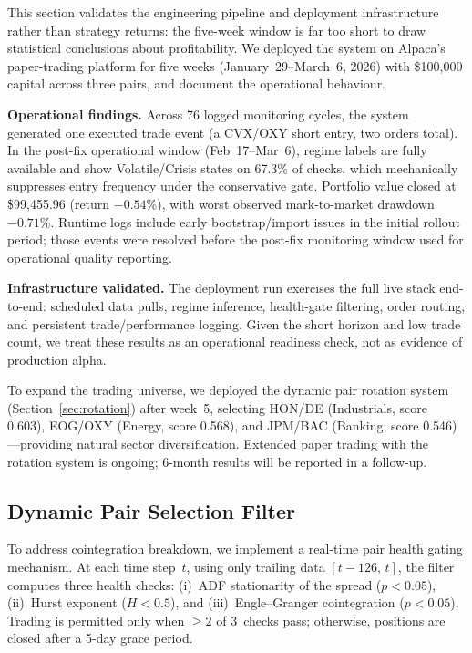 \documentclass{ieeeaccess}
\begin{document}
This section validates the engineering pipeline and deployment infrastructure rather than strategy returns: the five-week window is far too short to draw statistical conclusions about profitability.
We deployed the system on Alpaca's paper-trading platform for five weeks (January~29--March~6, 2026) with \$100{,}000 capital across three pairs, and document the operational behaviour.



\textbf{Operational findings.}
Across 76 logged monitoring cycles, the system generated one executed trade event (a CVX/OXY short entry, two orders total).
In the post-fix operational window (Feb~17--Mar~6), regime labels are fully available and show Volatile/Crisis states on 67.3\% of checks, which mechanically suppresses entry frequency under the conservative gate.
Portfolio value closed at \$99{,}455.96 (return $-0.54\%$), with worst observed mark-to-market drawdown $-0.71\%$.
Runtime logs include early bootstrap/import issues in the initial rollout period; those events were resolved before the post-fix monitoring window used for operational quality reporting.

\textbf{Infrastructure validated.}
The deployment run exercises the full live stack end-to-end: scheduled data pulls, regime inference, health-gate filtering, order routing, and persistent trade/performance logging.
Given the short horizon and low trade count, we treat these results as an operational readiness check, not as evidence of production alpha.

To expand the trading universe, we deployed the dynamic pair rotation system (Section~\ref{sec:rotation}) after week~5, selecting HON/DE (Industrials, score 0.603), EOG/OXY (Energy, score 0.568), and JPM/BAC (Banking, score 0.546)---providing natural sector diversification.
Extended paper trading with the rotation system is ongoing; 6-month results will be reported in a follow-up.

\subsection{Dynamic Pair Selection Filter}
\label{sec:dynamic_filter}

To address cointegration breakdown, we implement a real-time pair health gating mechanism.
At each time step~$t$, using only trailing data $[t{-}126,\, t]$, the filter computes three health checks:
(i)~ADF stationarity of the spread ($p < 0.05$),
(ii)~Hurst exponent ($H < 0.5$), and
(iii)~Engle--Granger cointegration ($p < 0.05$).
Trading is permitted only when $\geq 2$ of 3~checks pass; otherwise, positions are closed after a 5-day grace period.
\end{document}

